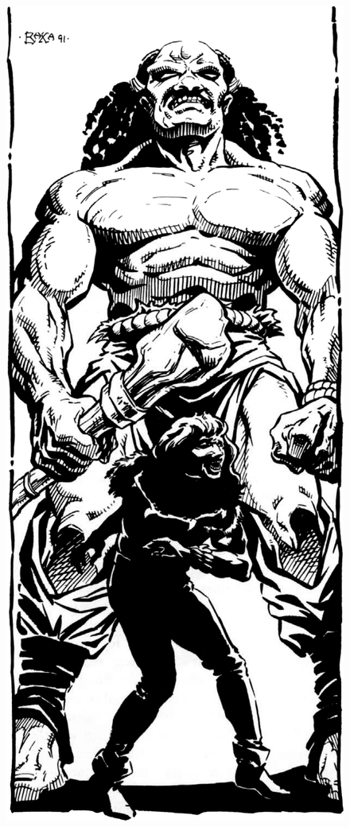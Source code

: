\begin{figure}[t!]
\centering
\includegraphics[width=\columnwidth]{images/halfgiant-1.png}
\WOTC
\end{figure}

